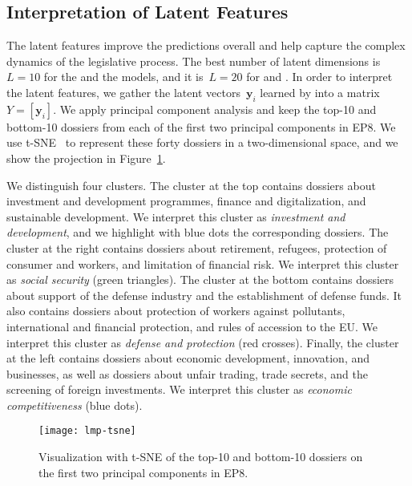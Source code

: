 \subsection{Interpretation of Latent Features}

The latent features improve the predictions overall and help capture the complex dynamics of the legislative process.
The best number of latent dimensions is~$L = 10$  for the  and the  models, and it is~$L = 20$ for  and .
In order to interpret the latent features, we gather the latent vectors~$\bm{y}_i$ learned by  into a matrix~$Y = [ \bm{y}_i ]$.
We apply principal component analysis and keep the top-10 and bottom-10 dossiers from each of the first two principal components in EP8.
We use t-SNE~\cite{maaten2008visualizing} to represent these forty dossiers in a two-dimensional space, and we show the projection in Figure~\ref{lmp:fig:tsne}.

We distinguish four clusters.
The cluster at the top contains dossiers about investment and development programmes, finance and digitalization, and sustainable development.
We interpret this cluster as \textit{investment and development}, and we highlight with blue dots the corresponding dossiers.
The cluster at the right contains dossiers about retirement, refugees, protection of consumer and workers, and limitation of financial risk.
We interpret this cluster as \textit{social security} (green triangles).
The cluster at the bottom contains dossiers about support of the defense industry and the establishment of defense funds.
It also contains dossiers about protection of workers against pollutants, international and financial protection, and rules of accession to the EU.
We interpret this cluster as \textit{defense and protection} (red crosses).
Finally, the cluster at the left contains dossiers about economic development, innovation, and businesses, as well as dossiers about unfair trading, trade secrets, and the screening of foreign investments.
We interpret this cluster as \textit{economic competitiveness} (blue dots).

\begin{figure}
  \centering
  \texttt{[image: lmp-tsne]}
	\caption{Visualization with t-SNE of the top-10 and bottom-10 dossiers on the first two principal components in EP8.}
	\label{lmp:fig:tsne}
\end{figure}

